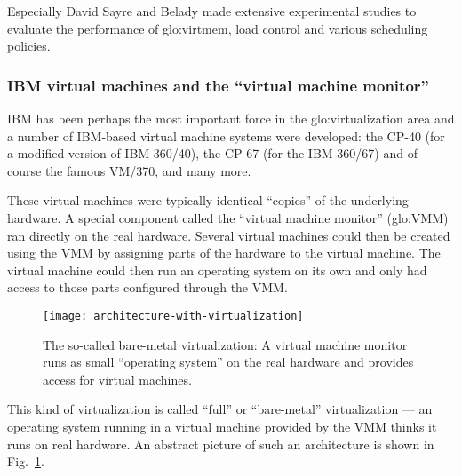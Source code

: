 Especially David  Sayre and Belady made extensive  experimental studies to
evaluate the  performance of  \gls{glo:virtmem}, load control  and various
scheduling policies\cite{Belady66,denning81}.

\subsubsection{IBM virtual machines and the ``virtual machine monitor''}

IBM    has   been   perhaps    the   most    important   force    in   the
\gls{glo:virtualization} area  and a  number of IBM-based  virtual machine
systems were developed: the CP-40  (for a modified version of IBM 360/40),
the CP-67 (for  the IBM 360/67) and of course the  famous VM/370, and many
more.

These  virtual  machines  were   typically  identical  ``copies''  of  the
underlying  hardware. A  special  component called  the ``virtual  machine
monitor''  (\gls{glo:VMM}) ran  directly  on the  real hardware.   Several
virtual machines could then be created using the VMM by assigning parts of
the hardware to the virtual machine. The virtual machine could then run an
operating system on its own and  only had access to those parts configured
through the VMM.

\begin{figure}
  \begin{center}
  \begin{minipage}{0.75\textwidth}
    \begin{center}
      \texttt{[image: architecture-with-virtualization]}
    \end{center}
    \caption[Virtualization   architecture]{The   so-called   bare-metal
      virtualization:   A  virtual   machine  monitor   runs   as  small
      ``operating system'' on the  real hardware and provides access for
      virtual machines.}
    \label{fig:arch-virt}
  \end{minipage}
  \end{center}
\end{figure}

This  kind   of  virtualization  is  called   ``full''  or  ``bare-metal''
virtualization  ---  an operating  system  running  in  a virtual  machine
provided by the  VMM thinks it runs on real  hardware. An abstract picture
of such an architecture is shown in Fig.~\ref{fig:arch-virt}.


